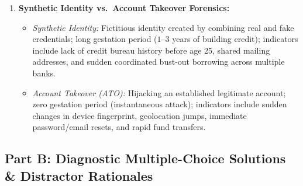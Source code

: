 \begin{enumerate}[label=\textbf{P9.\arabic*}]
    \item \textbf{Synthetic Identity vs.~Account Takeover Forensics:}
    \begin{itemize}
        \item \textit{Synthetic Identity:} Fictitious identity created by combining real and fake credentials; long gestation period ($1$--$3$ years of building credit); indicators include lack of credit bureau history before age 25, shared mailing addresses, and sudden coordinated bust-out borrowing across multiple banks.
        \item \textit{Account Takeover (ATO):} Hijacking an established legitimate account; zero gestation period (instantaneous attack); indicators include sudden changes in device fingerprint, geolocation jumps, immediate password/email resets, and rapid fund transfers.
    \end{itemize}
\end{enumerate}

\subsection*{Part B: Diagnostic Multiple-Choice Solutions \& Distractor Rationales}

